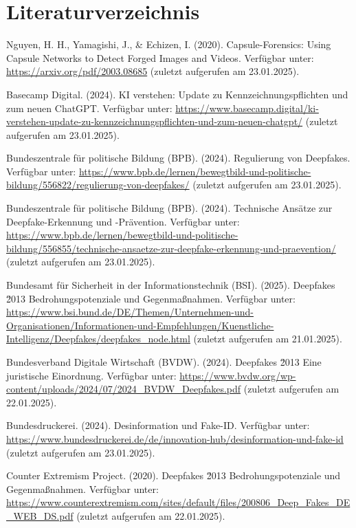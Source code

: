 \documentclass[a4paper,12pt]{article}
\begin{document}
\section*{Literaturverzeichnis}
\begin{thebibliography}{99}
     Nguyen, H. H., Yamagishi, J., \& Echizen, I. (2020). Capsule-Forensics: Using Capsule Networks to Detect Forged Images and Videos.
    Verfügbar unter: \url{https://arxiv.org/pdf/2003.08685} (zuletzt aufgerufen am 23.01.2025).
    
     Basecamp Digital. (2024). KI verstehen: Update zu Kennzeichnungspflichten und zum neuen ChatGPT. 
    Verfügbar unter: \url{https://www.basecamp.digital/ki-verstehen-update-zu-kennzeichnungspflichten-und-zum-neuen-chatgpt/} (zuletzt aufgerufen am 23.01.2025).
    
     Bundeszentrale für politische Bildung (BPB). (2024). Regulierung von Deepfakes. 
    Verfügbar unter: \url{https://www.bpb.de/lernen/bewegtbild-und-politische-bildung/556822/regulierung-von-deepfakes/} (zuletzt aufgerufen am 23.01.2025). 
    
     Bundeszentrale für politische Bildung (BPB). (2024). Technische Ansätze zur Deepfake-Erkennung und -Prävention. 
    Verfügbar unter: \url{https://www.bpb.de/lernen/bewegtbild-und-politische-bildung/556855/technische-ansaetze-zur-deepfake-erkennung-und-praevention/} (zuletzt aufgerufen am 23.01.2025).
    
     Bundesamt für Sicherheit in der Informationstechnik (BSI). (2025). Deepfakes \u2013 Bedrohungspotenziale und Gegenmaßnahmen. 
    Verfügbar unter: \url{https://www.bsi.bund.de/DE/Themen/Unternehmen-und-Organisationen/Informationen-und-Empfehlungen/Kuenstliche-Intelligenz/Deepfakes/deepfakes_node.html} (zuletzt aufgerufen am 21.01.2025).
    
     Bundesverband Digitale Wirtschaft (BVDW). (2024). Deepfakes \u2013 Eine juristische Einordnung. 
    Verfügbar unter: \url{https://www.bvdw.org/wp-content/uploads/2024/07/2024_BVDW_Deepfakes.pdf} (zuletzt aufgerufen am 22.01.2025). 
    
     Bundesdruckerei. (2024). Desinformation und Fake-ID. 
    Verfügbar unter: \url{https://www.bundesdruckerei.de/de/innovation-hub/desinformation-und-fake-id} (zuletzt aufgerufen am 23.01.2025). 
    
     Counter Extremism Project. (2020). Deepfakes \u2013 Bedrohungspotenziale und Gegenmaßnahmen.
    Verfügbar unter: \url{https://www.counterextremism.com/sites/default/files/200806_Deep_Fakes_DE_WEB_DS.pdf} (zuletzt aufgerufen am 22.01.2025).
    

\end{thebibliography}
\end{document}
